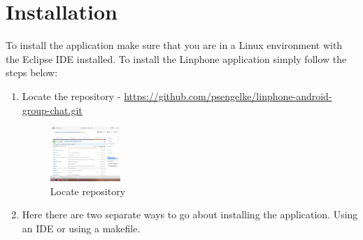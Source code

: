 \documentclass[11pt]{article}
\begin{document}
\newpage
\section{Installation}
To install the application make sure that you are in a Linux environment with the Eclipse IDE installed.
To install the Linphone application simply follow the steps below:
\begin{enumerate}
\item Locate the repository - \url{https://github.com/psengelke/linphone-android-group-chat.git}
\begin{figure}[H]
\includegraphics[width=100px]{./images/repoLocate.png}
\caption{Locate repository}
\label{repoLocate}
\end{figure}
\item Here there are two separate ways to go about installing the application. Using an IDE or using a makefile. 
\end{enumerate}
\end{document}
